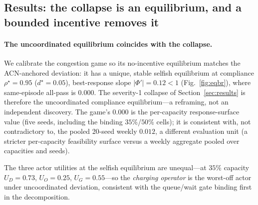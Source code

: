 \documentclass[12pt]{article}
\newcommand{\figref}[1]{Fig.~\ref{#1}}
\begin{document}
\subsection{Results: the collapse is an equilibrium, and a bounded incentive removes it}
\label{sec:game-results}

\paragraph{The uncoordinated equilibrium coincides with the collapse.} We calibrate the congestion game so its no-incentive equilibrium matches the ACN-anchored deviation: it has a unique, stable selfish equilibrium at compliance $\rho^\star=0.95$ ($d^\star=0.05$), best-response slope $|\Phi'|=0.12<1$ (\figref{fig:eqbr}), where same-episode all-pass is $0.000$. The severity-1 collapse of Section~\ref{sec:results} is therefore the uncoordinated compliance equilibrium---a reframing, not an independent discovery. The game's $0.000$ is the per-capacity response-surface value (five seeds, including the binding $35\%$/$50\%$ cells); it is consistent with, not contradictory to, the pooled 20-seed weekly $0.012$, a different evaluation unit (a stricter per-capacity feasibility surface versus a weekly aggregate pooled over capacities and seeds).

The three
actor utilities at the selfish equilibrium are unequal---at $35\%$ capacity
$U_D=0.73$, $U_O=0.25$, $U_G=0.55$---so the \emph{charging operator} is the worst-off
actor under uncoordinated deviation, consistent with the queue/wait gate binding first
in the decomposition.
\end{document}

